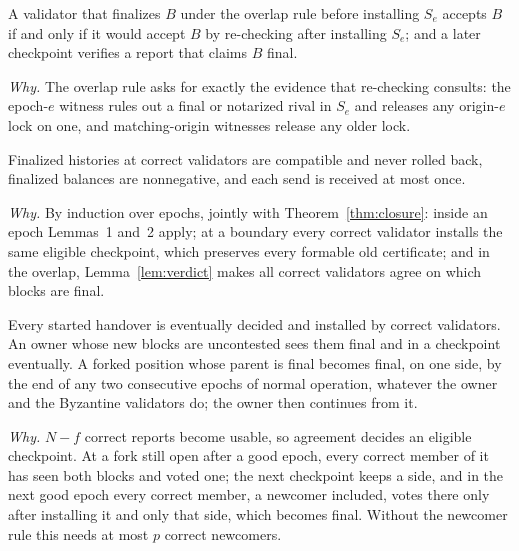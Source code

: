 \setcounter{lemma}{7}
\begin{lemma}
\label{lem:verdict}
A validator that finalizes $B$ under the overlap rule before installing $S_e$ accepts $B$ if and only if it would accept $B$ by re-checking after installing $S_e$; and a later checkpoint verifies a report that claims $B$ final.
\end{lemma}
\emph{Why.} The overlap rule asks for exactly the evidence that re-checking consults: the epoch-$e$ witness rules out a final or notarized rival in $S_e$ and releases any origin-$e$ lock on one, and matching-origin witnesses release any older lock.

\begin{theorem}
\label{thm:safety}
Finalized histories at correct validators are compatible and never rolled back, finalized balances are nonnegative, and each send is received at most once.
\end{theorem}
\emph{Why.} By induction over epochs, jointly with Theorem~\ref{thm:closure}: inside an epoch Lemmas~1 and~2 apply; at a boundary every correct validator installs the same eligible checkpoint, which preserves every formable old certificate; and in the overlap, Lemma~\ref{lem:verdict} makes all correct validators agree on which blocks are final.

\begin{theorem}[Termination]
\label{thm:live}
Every started handover is eventually decided and installed by correct validators. An owner whose new blocks are uncontested sees them final and in a checkpoint eventually. A forked position whose parent is final becomes final, on one side, by the end of any two consecutive epochs of normal operation, whatever the owner and the Byzantine validators do; the owner then continues from it.
\end{theorem}
\emph{Why.} $N-f$ correct reports become usable, so agreement decides an eligible checkpoint. At a fork still open after a good epoch, every correct member of it has seen both blocks and voted one; the next checkpoint keeps a side, and in the next good epoch every correct member, a newcomer included, votes there only after installing it and only that side, which becomes final. Without the newcomer rule this needs at most $p$ correct newcomers.
